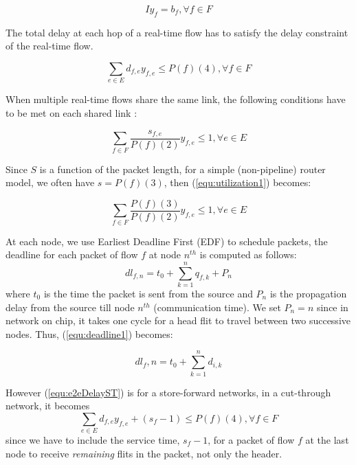 \documentclass[a4]{article}
\begin{document}
\begin{equation}\label{connectivity1} Iy_f=b_f,\forall f \in F
\end{equation}

The total delay at each hop of a real-time flow has to satisfy the delay constraint
of the real-time flow.

\begin{equation}\label{equ:e2eDelayST}
\sum_{e \in E}d_{f,e}y_{f,e} \leq P(f)(4), \forall f \in F
\end{equation}

When multiple real-time flows share the same link, the following conditions
 have to be met on each shared link \cite{Ferrari90ascheme, VermaJitter91}:

\begin{equation}\label{equ:utilization1}
\sum_{f \in F}\frac{s_{f,e}}{P(f)(2)}y_{f,e} \leq 1, \forall e \in E
\end{equation}

Since $S$ is a function of the packet length, for a simple (non-pipeline) router
model, we often have $s=P(f)(3)$, then (\ref{equ:utilization1}) becomes:

\begin{equation}\label{equ:utilization2}
\sum_{f \in F}\frac{P(f)(3)}{P(f)(2)}y_{f,e} \leq 1, \forall e \in E
\end{equation}

At each node, we use Earliest Deadline First (EDF) \cite{VermaJitter91} 
to schedule packets, the deadline for each packet of flow $f$ at node $n^{th}$
is computed as follows: 
\begin{equation}\label{equ:deadline1}
dl_{f,n}=t_0 + \sum_{k=1}^{n}q_{f,k}+P_n
\end{equation}
where $t_0$ is the time the packet is sent from the source and $P_n$ is the propagation
delay from the source till node $n^{th}$ (communication time). We set
$P_n=n$ since in network on chip, it takes one cycle for a head flit to travel
between two successive nodes. Thus, (\ref{equ:deadline1}) becomes:

\begin{equation}\label{equ:deadline2}
dl_f,n=t_0 + \sum_{k=1}^{n}d_{i,k}
\end{equation}

However (\ref{equ:e2eDelayST}) is for a store-forward networks, in a
cut-through network, it becomes
\begin{equation}\label{equ:e2eDelayCT}
\sum_{e \in E}d_{f,e}y_{f,e} + (s_f - 1) \leq P(f)(4), \forall f \in F
\end{equation}
since we have to include the service time, $s_f-1$, for a packet of flow $f$ at
the last node to receive {\em remaining} flits in the packet, not only the
header.
\end{document}
